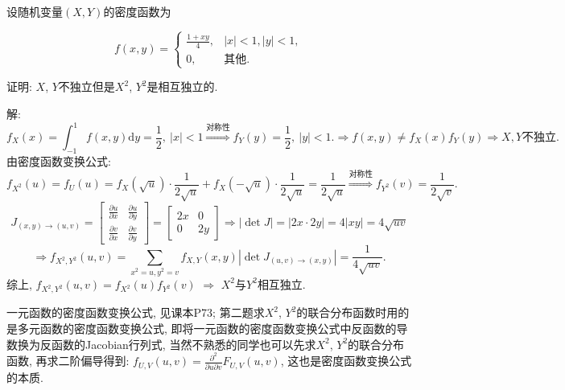 \documentclass[standard]{ExBook}
\begin{document}
\begin{qitems}
\vspace{-5em}

    \begin{bbox}
    \begin{shaded}
        \qitem
设随机变量$(X,Y)$的密度函数为
\vspace{-2em}
\begin{center}
\begin{equation}
    f(x,y)=
    \left\{
    \begin{array}{cl}
        \nonumber
        \displaystyle\frac{1+xy}{4}, &|x|<1,|y|<1,\\
        0, & \text{其他}.
    \end{array}
    \right.
\end{equation}
\end{center}
证明: $X$, $Y$不独立但是$X^2$, $Y^2$是相互独立的.
    \end{shaded}
    \end{bbox}

\vspace{-5em}

    \begin{bbox}
解: 
$$f_{X}(x)=\int_{-1}^{1}f(x,y)\mathrm{d}y=\frac{1}{2},\ |x|<1 \overset{\text{对称性}}{\Longrightarrow} f_{Y}(y)=\frac{1}{2},\ |y|<1. \Longrightarrow f(x,y)\neq f_{X}(x)f_{Y}(y) \Longrightarrow X,Y\text{不独立}.$$
由密度函数变换公式:
$$f_{X^2}(u)=f_{U}(u)=f_{X}(\sqrt{u})\cdot\frac{1}{2\sqrt{u}}+f_{X}(-\sqrt{u})\cdot\frac{1}{2\sqrt{u}}=\frac{1}{2\sqrt{u}} \overset{\text{对称性}}{\Longrightarrow} f_{Y^2}(v)=\frac{1}{2\sqrt{v}}.$$
\[
J_{(x,y)\to(u,v)} = 
\begin{bmatrix}
\frac{\partial u}{\partial x} & \frac{\partial u}{\partial y} \\
\frac{\partial v}{\partial x} & \frac{\partial v}{\partial y}
\end{bmatrix}
=
\begin{bmatrix}
2x & 0 \\
0 & 2y
\end{bmatrix}
\Longrightarrow |\det J| = |2x \cdot 2y| = 4|xy| = 4\sqrt{uv}
\]
\[
\Longrightarrow
f_{X^2,Y^2}(u,v)=\sum\limits_{x^2=u,y^2=v}f_{X,Y}(x,y)|\det J_{(u,v)\to(x,y)}|=\frac{1}{4\sqrt{uv}}.
\]
综上, $f_{X^2,Y^2}(u,v)=f_{X^2}(u)f_{Y^2}(v)$ $\Longrightarrow$ $X^2$与$Y^2$相互独立.

\textcolor{themeColor}{\selectfont {} 一元函数的密度函数变换公式, 见课本P73; 第二题求$X^2$, $Y^2$的联合分布函数时用的是多元函数的密度函数变换公式, 即将一元函数的密度函数变换公式中反函数的导数换为反函数的Jacobian行列式, 当然不熟悉的同学也可以先求$X^2$, $Y^2$的联合分布函数, 再求二阶偏导得到: $f_{U,V}(u,v)=\frac{\partial^2}{\partial u\partial v}F_{U,V}(u,v)$, 这也是密度函数变换公式的本质.}
    \end{bbox}


\end{qitems}
\end{document}
